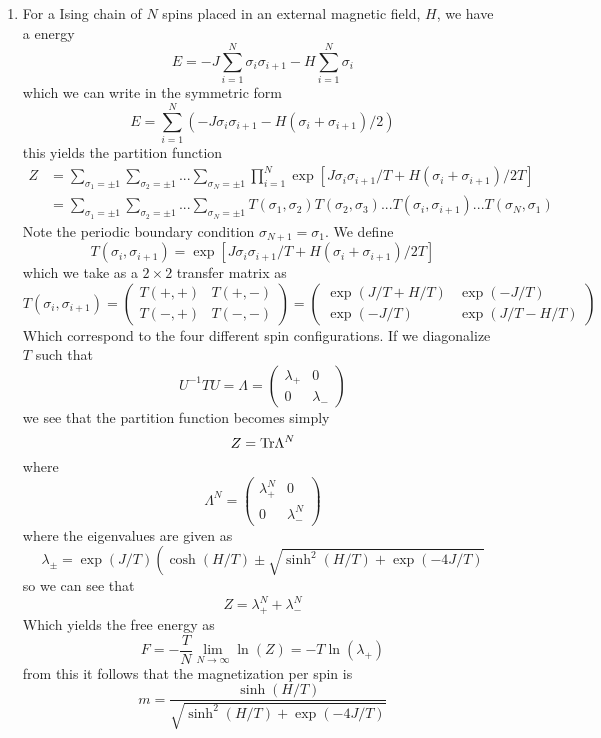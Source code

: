 \documentclass[11pt]{article}
\numberwithin{equation}{section}
\begin{document}
\begin{enumerate}[(1)]
\item For a Ising chain of $N$ spins placed in an external magnetic field, $H$, we have a 
energy
$$E = -J\sum_{i=1}^{N}\sigma_i\sigma_{i+1}-H\sum_{i=1}^{N}\sigma_{i}$$
which we can write in the symmetric form
$$E = \sum_{i=1}^{N}\left(-J\sigma_i\sigma_{i+1}-H(\sigma_{i}+\sigma_{i+1})/2\right)$$
this yields the partition function
\begin{align*}
Z &= \sum_{\sigma_1=\pm1}\sum_{\sigma_2=\pm1}...\sum_{\sigma_N=\pm1}\prod_{i=1}^{N}\exp[J\sigma_{i}\sigma_{i+1}/T+H(\sigma_i+\sigma_{i+1})/2T]\\
&= \sum_{\sigma_1=\pm1}\sum_{\sigma_2=\pm1}...\sum_{\sigma_N=\pm1}T(\sigma_1,\sigma_2)T(\sigma_2,\sigma_3)...T(\sigma_i,\sigma_{i+1})...T(\sigma_N,\sigma_1)
\end{align*}
Note the periodic boundary condition $\sigma_{N+1} = \sigma_1$. We define
$$T(\sigma_{i},\sigma_{i+1}) = \exp[J\sigma_{i}\sigma_{i+1}/T+H(\sigma_i+\sigma_{i+1})/2T]$$
which we take as a $2\times2$ transfer matrix as
$$T(\sigma_{i},\sigma_{i+1}) = \left(\begin{array}{cc}
                                T(+,+) &T(+,-)\\
                                T(-,+) &T(-,-)
                               \end{array}\right)
= \left(\begin{array}{cc}
       \exp(J/T+H/T)  &\exp(-J/T)\\
       \exp(-J/T)     &\exp(J/T-H/T)
  \end{array}\right)$$
Which correspond to the four different spin configurations. If we diagonalize $T$ such that
$$U^{-1}TU = \Lambda = \left(\begin{array}{cc}
                         \lambda_{+}   &0\\
                         0             &\lambda_{-}
                       \end{array}\right)$$
we see that the partition function becomes simply
$$Z = \textnormal{Tr}\Lambda^N$$
where
$$\Lambda^N = \left(\begin{array}{cc}
                         \lambda_{+}^N   &0\\
                         0               &\lambda_{-}^N    
                       \end{array}\right)$$
where the eigenvalues are given as
$$\lambda_{\pm} = \exp(J/T)\left(\cosh(H/T)\pm\sqrt{\sinh^2(H/T)+\exp(-4J/T)}$$
so we can see that 
$$Z = \lambda_{+}^N + \lambda_{-}^N$$
Which yields the free energy as
$$F = -\frac{T}{N}\lim_{N\rightarrow\infty}\ln(Z) = -T\ln(\lambda_{+})$$
from this it follows that the magnetization per spin is
$$m = \frac{\sinh(H/T)}{\sqrt{\sinh^2(H/T)+\exp(-4J/T)}}$$
\end{enumerate}
\end{document}
